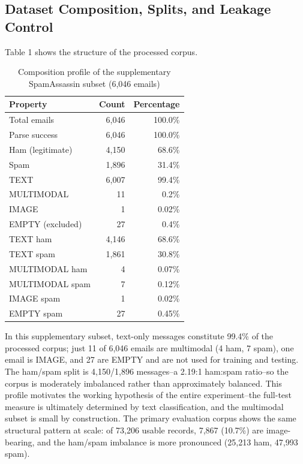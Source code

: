 \documentclass[10pt,twoside]{article}
\begin{document}
\subsection{Dataset Composition, Splits, and Leakage Control}\label{sec:6.2}

Table 1 shows the structure of the processed corpus.

\begin{table}[t]
\centering
\caption{Composition profile of the supplementary SpamAssassin subset (6,046 emails)}
\label{tab:composition}
\small
\setlength{\tabcolsep}{4pt}
\begin{tabular}{lrr}\toprule
Property & Count & Percentage \\
\midrule
Total emails & 6,046 & 100.0\% \\
Parse success & 6,046 & 100.0\% \\
Ham (legitimate) & 4,150 & 68.6\% \\
Spam & 1,896 & 31.4\% \\
TEXT & 6,007 & 99.4\% \\
MULTIMODAL & 11 & 0.2\% \\
IMAGE & 1 & 0.02\% \\
EMPTY (excluded) & 27 & 0.4\% \\
TEXT ham & 4,146 & 68.6\% \\
TEXT spam & 1,861 & 30.8\% \\
MULTIMODAL ham & 4 & 0.07\% \\
MULTIMODAL spam & 7 & 0.12\% \\
IMAGE spam & 1 & 0.02\% \\
EMPTY spam & 27 & 0.45\% \\
\bottomrule
\end{tabular}

\end{table}

In this supplementary subset, text-only messages constitute 99.4\% of the processed corpus; just 11 of 6,046 emails are multimodal (4 ham, 7 spam), one email is IMAGE, and 27 are EMPTY and are not used for training and testing. The ham/spam split is 4,150/1,896 messages--a 2.19:1 ham:spam ratio--so the corpus is moderately imbalanced rather than approximately balanced. This profile motivates the working hypothesis of the entire experiment--the full-test measure is ultimately determined by text classification, and the multimodal subset is small by construction. The primary evaluation corpus shows the same structural pattern at scale: of 73,206 usable records, 7,867 (10.7\%) are image-bearing, and the ham/spam imbalance is more pronounced (25,213 ham, 47,993 spam).
\end{document}
